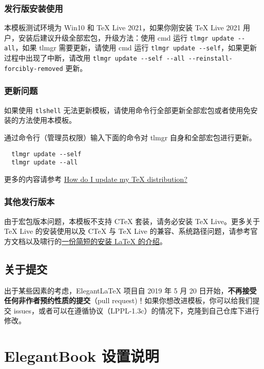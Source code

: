 \documentclass[cn,10pt,math=newtx,citestyle=gb7714-2015,bibstyle=gb7714-2015]{elegantbook}
\begin{document}
\subsection{发行版安装使用}

本模板测试环境为 Win10 和 TeX Live 2021，如果你刚安装 \TeX{} Live 2021 用户，安装后建议升级全部宏包，升级方法：使用 cmd 运行 \lstinline{tlmgr update --all}，如果 tlmgr 需要更新，请使用 cmd 运行 \lstinline{tlmgr update --self}，如果更新过程中出现了中断，请改用 \lstinline{tlmgr update --self --all --reinstall-forcibly-removed} 更新。

\subsection{更新问题}

如果使用 \lstinline{tlshell} 无法更新模板，请使用命令行全部更新全部宏包或者使用免安装的方法使用本模板。

通过命令行（管理员权限）输入下面的命令对 tlmgr 自身和全部宏包进行更新。

\begin{lstlisting}
  tlmgr update --self 
  tlmgr update --all
\end{lstlisting}

更多的内容请参考 \href{https://tex.stackexchange.com/questions/55437/how-do-i-update-my-tex-distribution}{How do I update my \TeX{} distribution?}

\subsection{其他发行版本}

由于宏包版本问题，本模板不支持 C\TeX{} 套装，请务必安装 TeX Live。更多关于 \TeX{} Live 的安装使用以及 C\TeX{} 与 \TeX{} Live 的兼容、系统路径问题，请参考官方文档以及啸行的\href{https://github.com/OsbertWang/install_latex/releases}{一份简短的安装 \LaTeX{} 的介绍}。


\section{关于提交}

出于某些因素的考虑，Elegant\LaTeX{} 项目自 2019 年 5 月 20 日开始，\textbf{不再接受任何非作者预约性质的提交}（pull request)！如果你想改进模板，你可以给我们提交 issues，或者可以在遵循协议（LPPL-1.3c）的情况下，克隆到自己仓库下进行修改。


\chapter{ElegantBook 设置说明}
\end{document}
